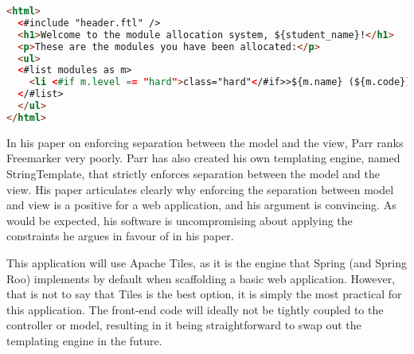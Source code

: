 \begin{lstlisting}[language=HTML]
<html>
  <#include "header.ftl" />
  <h1>Welcome to the module allocation system, ${student_name}!</h1>
  <p>These are the modules you have been allocated:</p>
  <ul>
  <#list modules as m>
    <li <#if m.level == "hard">class="hard"</#if>>${m.name} (${m.code})</li>
  </#list>
  </ul>
</html>
\end{lstlisting}

In his paper on enforcing separation between the model and the view, Parr
\cite{Parr2004templateengines} ranks Freemarker very poorly. Parr has also
created his own templating engine, named StringTemplate, that strictly
enforces separation between the model and the view. His paper articulates
clearly why enforcing the separation between model and view is a positive for
a web application, and his argument is convincing. As would be expected, his
software is uncompromising about applying the constraints he argues in favour
of in his paper.

This application will use Apache Tiles, as it is the engine that Spring (and
Spring Roo) implements by default when scaffolding a basic web application.
However, that is not to say that Tiles is the best option, it is simply the
most practical for this application. The front-end code will ideally not be
tightly coupled to the controller or model, resulting in it being
straightforward to swap out the templating engine in the future.

